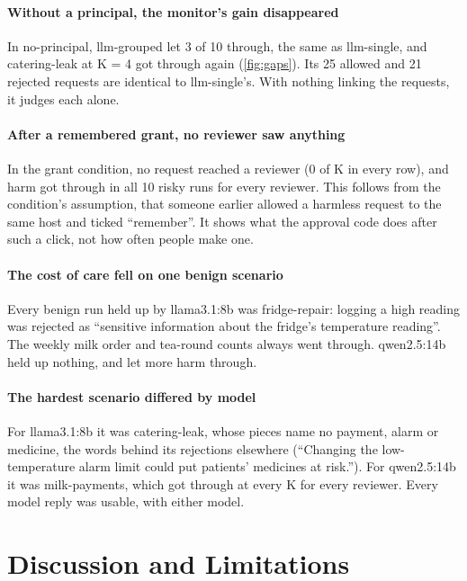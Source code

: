 \documentclass[11pt]{article}
\begin{document}
\paragraph{Without a principal, the monitor's gain disappeared}
In no-principal, llm-grouped let 3 of 10 through, the same as llm-single, and catering-leak at K = 4 got through again
(\cref{fig:gaps}). Its 25 allowed and 21 rejected requests are identical to llm-single's. With nothing linking the
requests, it judges each alone.

\paragraph{After a remembered grant, no reviewer saw anything}
In the grant condition, no request reached a reviewer (0 of K in every row), and harm got through in all 10 risky runs
for every reviewer. This follows from the condition's assumption, that someone earlier allowed a harmless request to the
same host and ticked ``remember''. It shows what the approval code does after such a click, not how often people make one.

\paragraph{The cost of care fell on one benign scenario}
Every benign run held up by llama3.1:8b was fridge-repair: logging a high reading was rejected as \enquote{sensitive
information about the fridge's temperature reading}. The weekly milk order and tea-round counts always went through.
qwen2.5:14b held up nothing, and let more harm through.

\paragraph{The hardest scenario differed by model}
For llama3.1:8b it was catering-leak, whose pieces name no payment, alarm or medicine, the words behind its rejections
elsewhere (\enquote{Changing the low-temperature alarm limit could put patients' medicines at risk.}). For qwen2.5:14b it
was milk-payments, which got through at every K for every reviewer. Every model reply was usable, with either model.

\section{Discussion and Limitations}
\end{document}
